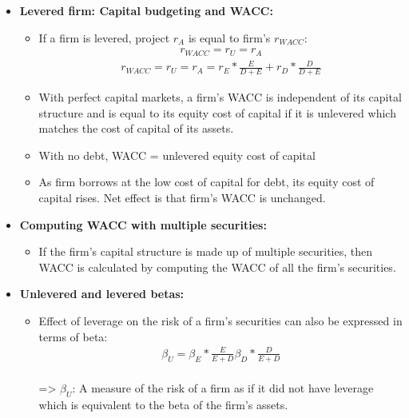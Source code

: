 \documentclass[ieeetran]{article}
\begin{document}
\begin{itemize}
\item \textbf{Levered firm: Capital budgeting and WACC:}
	\begin{itemize}
		\item If a firm is levered, project $r_A$ is equal to firm's $r_{WACC}$:
			\large
			\begin{equation*}
			\boxed{
			\begin{aligned}
				r_{WACC} = r_U = r_A	
			\end{aligned}
			}
			\end{equation*}
			\normalsize
			\large
			\begin{equation*}
			\boxed{
			\begin{aligned}
				r_{WACC} = r_U = r_A = r_E * \frac{E}{D + E} + r_D * \frac{D}{D + E}
			\end{aligned}
			}
			\end{equation*}
			\normalsize
\item With perfect capital markets, a firm's WACC is independent of its capital structure and is equal to its equity cost of capital if it is unlevered which matches the cost of capital of its assets.

	\item With no debt, WACC = unlevered equity cost of capital
	\item As firm borrows at the low cost of capital for debt, its equity cost of capital rises. Net effect is that firm's WACC is unchanged.
			
	\end{itemize}
\item \textbf{Computing WACC with multiple securities:}
	\begin{itemize}
	  \item If the firm's capital structure is made up of multiple securities, then WACC is calculated by computing the WACC of all the firm's securities.
	\end{itemize}

\item \textbf{Unlevered and levered betas:}
	\begin{itemize}
	  \item Effect of leverage on the risk of a firm's securities can also be expressed in terms of beta:
		  \large
		  \begin{equation*}
		  \boxed{
		  \begin{aligned}
		  \beta_U = \beta_E * \frac{E}{E + D} \beta_D * \frac{D}{E + D} 
		  \end{aligned}
		  }
		  \end{equation*}
		  \\
		  \normalsize
		  => $\beta_U$: A measure of the risk of a firm as if it did not have leverage which is equivalent to the beta of the firm's assets.


\end{itemize}
\end{itemize}
\end{document}

